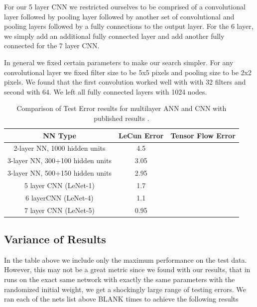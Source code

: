 \documentclass[12pt, twocolumn]{article}
\begin{document}
For our 5 layer CNN we restricted ourselves to be comprised of a convolutional layer followed by pooling layer followed by another set of convolutional and pooling layers followed by a fully connections to the output layer. For the 6 layer, we simply add an additional fully connected layer and add another fully connected for the 7 layer CNN. 


In general we fixed certain parameters to make our search simpler. For any convolutional layer we fixed filter size to be 5x5 pixels and pooling size to be 2x2 pixels. We found that the first convolution worked well with with 32 filters and second with 64.   We left all fully connected layers with 1024 nodes. 



\begin{table}[t]
\begin{center}
\begin{tabular} { |c | c | c | }
    \hline
    NN Type & LeCun Error  &   Tensor Flow Error \\ \hline
    2-layer NN, 1000 hidden units & 4.5  & \\ \hline
    3-layer NN, 300+100 hidden units & 3.05  &  \\ \hline
    3-layer NN, 500+150 hidden units & 2.95  & \\ \hline
    5 layer CNN  (LeNet-1) & 1.7  & \\ \hline 
    6 layerCNN (LeNet-4) & 1.1 & \\ \hline 
    7 layer CNN (LeNet-5) &  0.95  &\\ \hline
\end{tabular}
\label{table: MNISTLeCun}
\caption{Comparison of Test Error results for multilayer ANN and CNN with published results \cite{LeCun1998}.}
\end{center}
\end{table}


\subsection{Variance of Results}
In the table above we include only the maximum performance on the test data. However, this may not be a great metric since we found with our results, that in runs on the exact same network with exactly the same parameters with the randomized initial weight, we get a shockingly large range of testing errors. We ran each of the nets list above BLANK times  to achieve the following results
\end{document}
